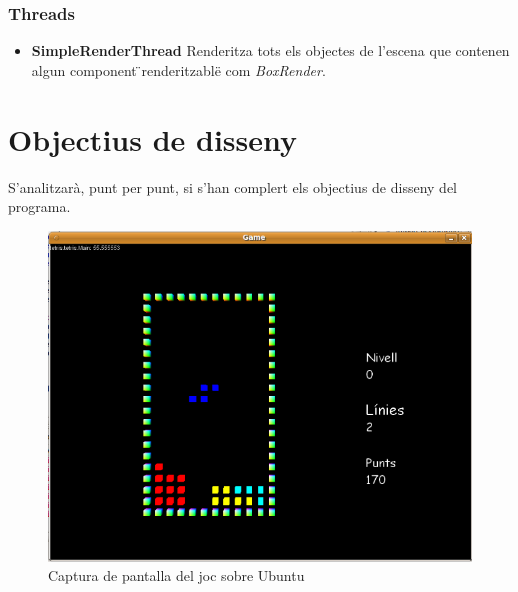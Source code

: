     \subsubsection{Threads}
    
      \begin{itemize}
        \item {\bf SimpleRenderThread}
          Renderitza tots els objectes de l'escena que contenen algun component \"{}renderitzable\"{} com {\em BoxRender}.
          
      \end{itemize}
      
\section{Objectius de disseny}

  S'analitzarà, punt per punt, si s'han complert els objectius de disseny del programa.
    
  \begin{figure}
    \centering
    \includegraphics[width=0.5\linewidth]{./img/ImatgeUbuntu.png}
    \caption{Captura de pantalla del joc sobre Ubuntu \label{fig:ImatgeUbuntu}}
  \end{figure}

